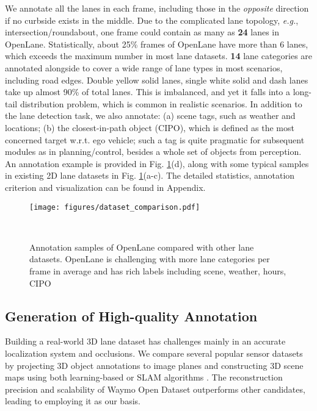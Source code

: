 \documentclass[runningheads]{llncs}
\begin{document}
We annotate all the lanes in each frame, including those in the \textit{opposite} direction if no curbside exists in the middle. Due to the  complicated lane topology, \textit{e.g.}, intersection/roundabout, one frame could contain 
as many as
\textbf{24} lanes in OpenLane. Statistically, about 25\% frames of OpenLane have more than 6 lanes, which exceeds the maximum number in most lane datasets. 
\textbf{14} lane categories are annotated alongside to cover a wide range of lane types in most scenarios, including road edges. 
Double yellow solid lanes, single white solid and dash lanes take up almost 90\%
of total lanes. 
This is imbalanced, and yet it falls into a long-tail distribution
problem, which is common in realistic scenarios.
In addition to the lane detection task, we also annotate: (a) scene tags, such as weather and locations; (b) the closest-in-path object (CIPO), which is defined as the most concerned target w.r.t. ego vehicle; such a tag is quite pragmatic for subsequent modules as in planning/control, besides a whole set of objects from perception. 
An annotation example is provided in Fig. \ref{fig: dataset_comparison}(d), along with some typical samples in existing 2D lane datasets in Fig. \ref{fig: dataset_comparison}(a-c).
The detailed statistics, annotation criterion and visualization  can be found in Appendix.
\begin{figure}[t!]
    \centering
    \begin{minipage}[c]{0.5\textwidth}
      \texttt{[image: figures/dataset\_comparison.pdf]}
    \end{minipage} ~ \begin{minipage}[c]{0.34\textwidth}
      \caption{Annotation samples of OpenLane compared with other lane datasets. OpenLane is challenging with more lane categories per frame in average and has rich labels including scene, weather, hours, CIPO}
    \label{fig: dataset_comparison}
    \end{minipage}
\end{figure}
\subsection{Generation of High-quality Annotation} \label{sec: dataset - gen}
Building a real-world 3D lane dataset has challenges mainly in an accurate localization system and occlusions.
{We compare several popular sensor datasets \cite{chang2019argoverse,sun2020scalability,caesar2020nuscenes} by projecting 3D object annotations to image planes and constructing 3D scene maps using both learning-based \cite{teed2021droid} or SLAM algorithms \cite{liosam2020shan,lvisam2021shan}.}
The reconstruction precision and scalability of Waymo Open Dataset \cite{sun2020scalability} outperforms other candidates, leading to employing it as our basis.
\end{document}
